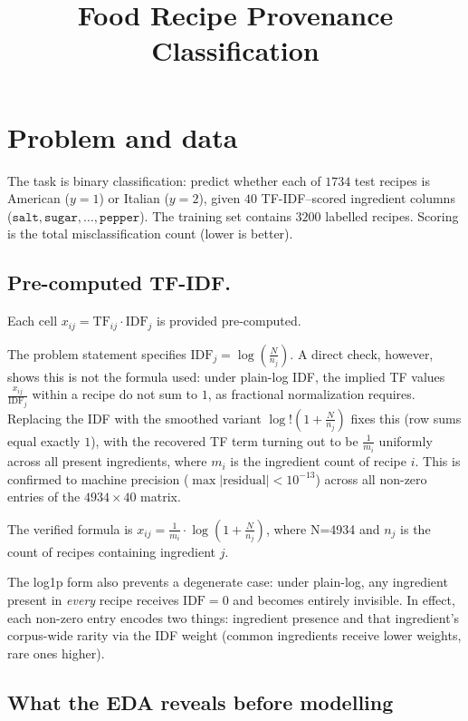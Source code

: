 \documentclass[11pt,a4paper]{article}
\title{\vspace{-2.5em}\textbf{Food Recipe Provenance Classification}}
\author{}
\date{}
\begin{document}
\maketitle
\vspace{-3em}

\section{Problem and data}

The task is binary classification: predict whether each of $1734$ test recipes is American
($y{=}1$) or Italian ($y{=}2$), given $40$ TF-IDF--scored ingredient columns
($\texttt{salt}, \texttt{sugar}, \ldots, \texttt{pepper}$). The training set contains $3200$
labelled recipes. Scoring is the total misclassification count (lower is better).

\subsection{Pre-computed TF-IDF.} 

Each cell $x_{ij}=\mathrm{TF}_{ij}\cdot\mathrm{IDF}_j$ is
provided pre-computed. 

The problem statement specifies
$\mathrm{IDF}_j=\log\!\left(\frac{N}{n_j}\right)$. A direct check, however, shows this is not the
formula used: under plain-log IDF, the implied TF values $\frac{x_{ij}}{\mathrm{IDF}_j}$
within a recipe do not sum to $1$, as fractional normalization requires. Replacing the IDF with the smoothed variant $\log!\left(1+\frac{N}{n_j}\right)$ fixes this (row sums equal exactly $1$), with the recovered TF term turning out to be $\frac{1}{m_i}$ uniformly across all present ingredients, where $m_i$ is the ingredient count of recipe $i$. This is
confirmed to machine precision ($\max|\text{residual}|<10^{-13}$) across all non-zero entries of the $4934\times 40$ matrix. 

The verified formula is
$ x_{ij} = \frac{1}{m_i} \cdot \log\!\left(1+\frac{N}{n_j}\right)$, where N=4934 and $n_j$ is the count of recipes containing ingredient $j$. 

The log1p form also prevents
a degenerate case: under plain-log, any ingredient present in \emph{every} recipe receives
$\mathrm{IDF}=0$ and becomes entirely invisible. In effect, each non-zero entry encodes two things: ingredient presence and that ingredient's corpus-wide rarity via the IDF weight (common ingredients receive lower weights, rare ones higher).

\subsection{What the EDA reveals before modelling}
\end{document}
